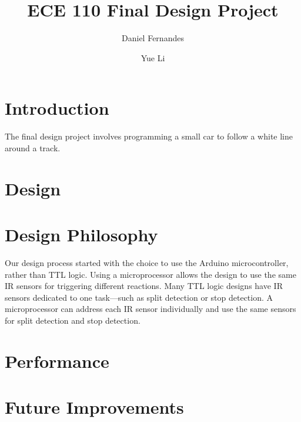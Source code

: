 \documentclass{article}
\author{Daniel Fernandes \and Yue Li}
\title{ECE 110 Final Design Project}
\begin{document}
\maketitle

\section{Introduction}
The final design project involves programming a small car to follow a white line around a track.

\section{Design}

\section{Design Philosophy}
Our design process started with the choice to use the Arduino microcontroller, rather than TTL logic. Using a microprocessor allows the design to use the same IR sensors for triggering different reactions. Many TTL logic designs have IR sensors dedicated to one task---such as split detection or stop detection. A microprocessor can address each IR sensor individually and use the same sensors for split detection and stop detection.

\section{Performance}

\section{Future Improvements}
\end{document}
